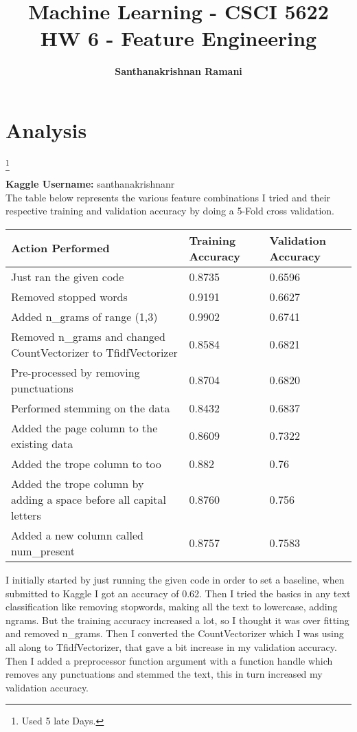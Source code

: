\documentclass{article}
\date{\displaydate{date}}
\title{\textbf{Machine Learning - CSCI 5622} \\
HW 6 - Feature Engineering}
\author{\textbf{Santhanakrishnan Ramani}}
\newcommand\blfootnote[1]{%
  \begingroup
  \renewcommand\thefootnote{}\footnote{#1}%
  \addtocounter{footnote}{-1}%
  \endgroup
}
\begin{document}
\maketitle

\section*{Analysis}
\blfootnote{Used 5 late Days.}
\textbf{Kaggle Username:} santhanakrishnanr\\

The table below represents the various feature combinations I tried and their respective training and validation accuracy by doing a 5-Fold cross validation.

\begin{table}[H]
\centering
\label{my-label}
\begin{tabular}{|l|l|l|}
\hline
Action Performed & Training Accuracy & Validation Accuracy \\
\hline
Just ran the given code                                             & 0.8735 & 0.6596 \\
Removed stopped words                                               & 0.9191 & 0.6627 \\
Added n\_grams of range (1,3)                                       & 0.9902 & 0.6741 \\
Removed n\_grams and changed CountVectorizer to TfidfVectorizer     & 0.8584 & 0.6821 \\
Pre-processed by removing punctuations                              & 0.8704 & 0.6820 \\
Performed stemming on the data                                      & 0.8432 & 0.6837 \\
Added the page column to the existing data                          & 0.8609 & 0.7322 \\
Added the trope column to too                                       & 0.882  & 0.76   \\
Added the trope column by adding a space before all capital letters & 0.8760 & 0.756  \\
Added a new column called num\_present                              & 0.8757 & 0.7583 \\
\hline
\end{tabular}
\end{table}

I initially started by just running the given code in order to set a baseline, when submitted to Kaggle I got an accuracy of 0.62. Then I tried the basics in any text classification like removing stopwords, making all the text to lowercase, adding ngrams. But the training accuracy increased a lot, so I thought it was over fitting and removed n\_grams. Then I converted the CountVectorizer which I was using all along to TfidfVectorizer, that gave a bit increase in my validation accuracy. Then I added a preprocessor function argument with a function handle which removes any punctuations and stemmed the text, this in turn increased my validation accuracy.\\
\end{document}
